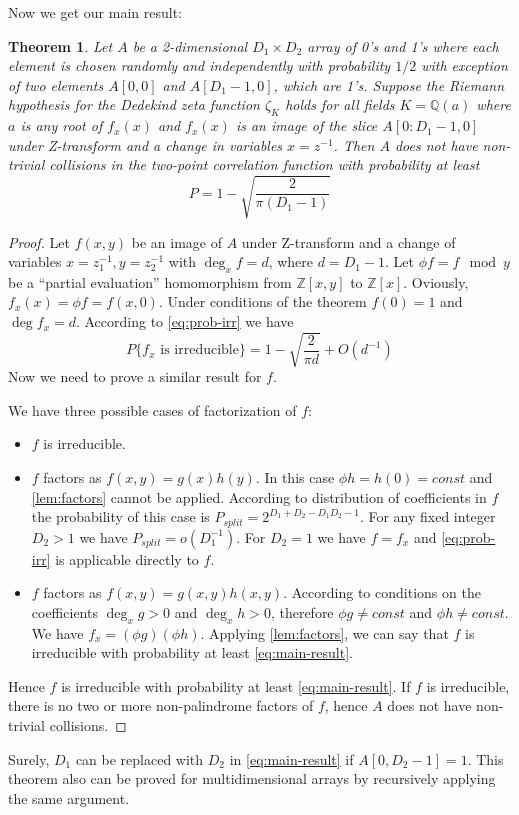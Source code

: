 \documentclass[12pt, a4paper]{article}
\newtheorem{theorem}{Theorem}
\begin{document}
Now we get our main result:
\begin{theorem}
  Let $A$ be a 2-dimensional $D_1 \times D_2$ array of 0's and 1's where each
  element is chosen randomly and independently with probability $1/2$ with
  exception of two elements $A[0, 0]$ and $A[D_1 - 1, 0]$, which are
  1's. Suppose the Riemann hypothesis for the Dedekind zeta function $\zeta_K$
  holds for all fields $K = \mathbb{Q}(a)$ where $a$ is any root of $f_x(x)$ and
  $f_x(x)$ is an image of the slice $A[0:D_1 -1, 0]$ under Z-transform and a
  change in variables $x = z^{-1}$. Then $A$ does not have non-trivial
  collisions in the two-point correlation function with probability at least
  \begin{equation}
    P = 1 - \sqrt{\frac{2}{\pi (D_1 - 1)}}
    \label{eq:main-result}
  \end{equation}
\end{theorem}
\begin{proof}
  Let $f(x, y)$ be an image of $A$ under Z-transform and a change of variables
  $x = z_1^{-1}, y = z_2^{-1}$ with $\deg_x f = d$, where $d = D_1 - 1$. Let
  $\phi f = f \mod y$ be a ``partial evaluation'' homomorphism from
  $\mathbb{Z}[x, y]$ to $\mathbb{Z}[x]$. Oviously,
  $f_x(x) = \phi f = f(x,0)$. Under conditions of the theorem $f(0) = 1$ and
  $\deg f_x = d$.  According to \cref{eq:prob-irr} we have
  \begin{equation*}
    P\{\text{$f_x$ is irreducible}\} = 1 - \sqrt{\frac{2}{\pi d}} + O(d^{-1})
  \end{equation*}
  Now we need to prove a similar result for $f$.

  We have three possible cases of factorization of $f$:
  \begin{itemize}
  \item $f$ is irreducible.
  \item $f$ factors as $f(x, y) = g(x)h(y)$. In this case
    $\phi h = h(0) = const$ and \cref{lem:factors} cannot be applied. According
    to distribution of coefficients in $f$ the probability of this case is
    $P_{split} = 2^{D_1 + D_2 - D_1 D_2 - 1}$. For any fixed integer $D_2 > 1$
    we have $P_{split} = o(D_1^{-1})$. For $D_2 = 1$ we have $f = f_x$ and
    \cref{eq:prob-irr} is applicable directly to $f$.
  \item $f$ factors as $f(x, y) = g(x, y) h(x, y)$. According to conditions on
    the coefficients $\deg_x g > 0$ and $\deg_x h > 0$, therefore
    $\phi g \ne const$ and $\phi h \ne const$. We have
    $f_x = (\phi g) (\phi h)$. Applying \cref{lem:factors}, we can say that
    $f$ is irreducible with probability at least \cref{eq:main-result}.
  \end{itemize}
  Hence $f$ is irreducible with probability at least \cref{eq:main-result}. If
  $f$ is irreducible, there is no two or more non-palindrome factors of $f$,
  hence $A$ does not have non-trivial collisions.
\end{proof}
Surely, $D_1$ can be replaced with $D_2$ in \cref{eq:main-result} if
$A[0, D_2 - 1] = 1$. This theorem also can be proved for multidimensional arrays
by recursively applying the same argument.
\end{document}
